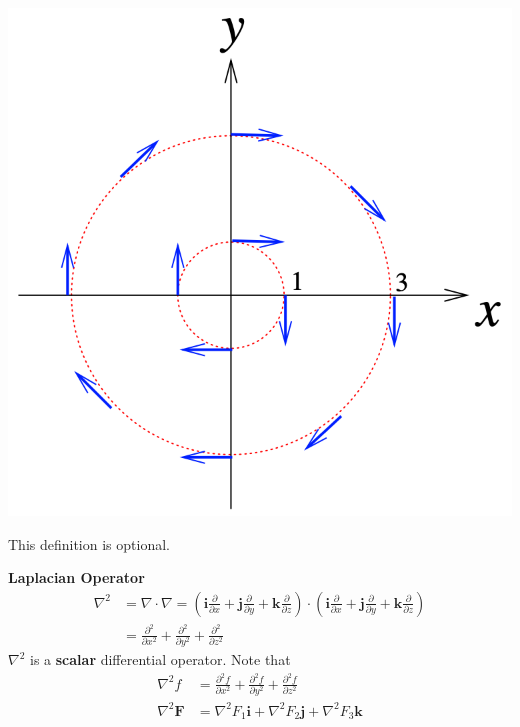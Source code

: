\begin{spacing}{1.3}
    \begin{center}
        \includegraphics[scale=0.4]{images/Ch15-ex1.2.png}
    \end{center}

    \newpage
    {\blue This definition is optional.}
    
    {\bf Laplacian Operator}
    $$
    \begin{aligned}
    \nabla^{2} &=\nabla \cdot \nabla=\left(\mathbf{i} \frac{\partial}{\partial x}+\mathbf{j} \frac{\partial}{\partial y}+\mathbf{k} \frac{\partial}{\partial z}\right) \cdot\left(\mathbf{i} \frac{\partial}{\partial x}+\mathbf{j} \frac{\partial}{\partial y}+\mathbf{k} \frac{\partial}{\partial z}\right) \\
    &=\frac{\partial^{2}}{\partial x^{2}}+\frac{\partial^{2}}{\partial y^{2}}+\frac{\partial^{2}}{\partial z^{2}}
    \end{aligned}
    $$
    $\nabla^{2}$ is a {\bf scalar} differential operator. Note that
    $$
    \begin{aligned}
    \nabla^{2} f &=\frac{\partial^{2} f}{\partial x^{2}}+\frac{\partial^{2} f}{\partial y^{2}}+\frac{\partial^{2} f}{\partial z^{2}} \\
    \nabla^{2} \mathbf{F} &=\nabla^{2} F_{1} \mathbf{i}+\nabla^{2} F_{2} \mathbf{j}+\nabla^{2} F_{3} \mathbf{k}
    \end{aligned}
    $$


\end{spacing}
